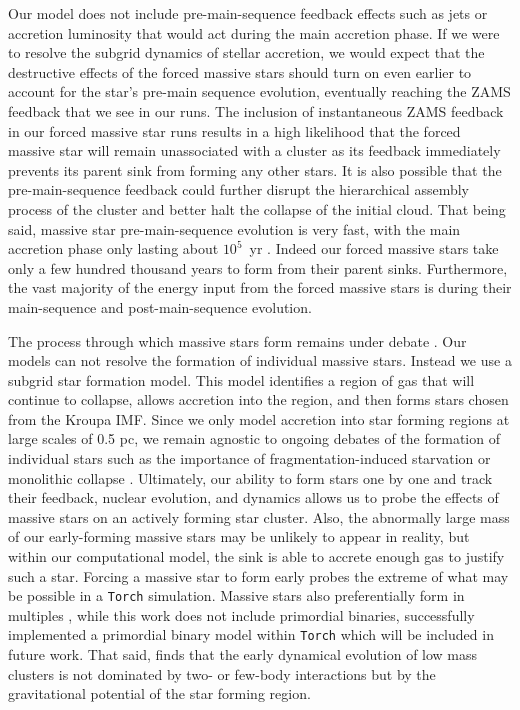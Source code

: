 \documentclass[twoside]{drexel-thesis}
\begin{document}
\begin{thesis}
Our model does not include pre-main-sequence feedback effects such as jets or accretion luminosity that would act during the main accretion phase. If we were to resolve the subgrid dynamics of stellar accretion, we would expect that the destructive effects of the forced massive stars should turn on even earlier to account for the star's pre-main sequence evolution, eventually reaching the ZAMS feedback that we see in our runs. The inclusion of instantaneous ZAMS feedback in our forced massive star runs results in a high likelihood that the forced massive star will remain unassociated with a cluster as its feedback immediately prevents its parent sink from forming any other stars. 
It is also possible that the pre-main-sequence feedback could further disrupt the hierarchical assembly process of the cluster and better halt the collapse of the initial cloud. That being said, massive star pre-main-sequence evolution is very fast, with the main accretion phase only lasting about $10^5$~yr \citep[e.g.][]{palla_star_1999}. Indeed our forced massive stars take only a few hundred thousand years to form from their parent sinks. Furthermore, the vast majority of the energy input from the forced massive stars is during their main-sequence and post-main-sequence evolution. 

The process through which massive stars form remains under debate \citep{tan_massive_2014,krumholz_formation_2015,motte_high-mass_2018}. Our models can not resolve the formation of individual massive stars. Instead we use a subgrid star formation model. This model identifies a region of gas that will continue to collapse, allows accretion into the region, and then forms stars chosen from the Kroupa IMF. Since we only model accretion into star forming regions at large scales of 0.5 pc, we remain agnostic to ongoing debates of the formation of individual stars such as the importance of fragmentation-induced starvation \citep{peters_limiting_2010} or monolithic collapse \citep{mckee_formation_2003}. Ultimately, our ability to form stars one by one and track their feedback, nuclear evolution, and dynamics allows us to probe the effects of massive stars on an actively forming star cluster. Also, the abnormally large mass of our early-forming massive stars may be unlikely to appear in reality, but within our computational model, the sink is able to accrete enough gas to justify such a star. Forcing a massive star to form early probes the extreme of what may be possible in a \texttt{Torch} simulation. Massive stars also preferentially form in multiples \citep{duchene_stellar_2013}, while this work does not include primordial binaries, \cite{cournoyer-cloutier_implementing_2021} successfully implemented a primordial binary model within \texttt{Torch} which will be included in future work. That said, \cite{cloutier_early_2023} finds that the early dynamical evolution of low mass clusters is not dominated by two- or few-body interactions but by the gravitational potential of the star forming region.


\end{thesis}
\end{document}
